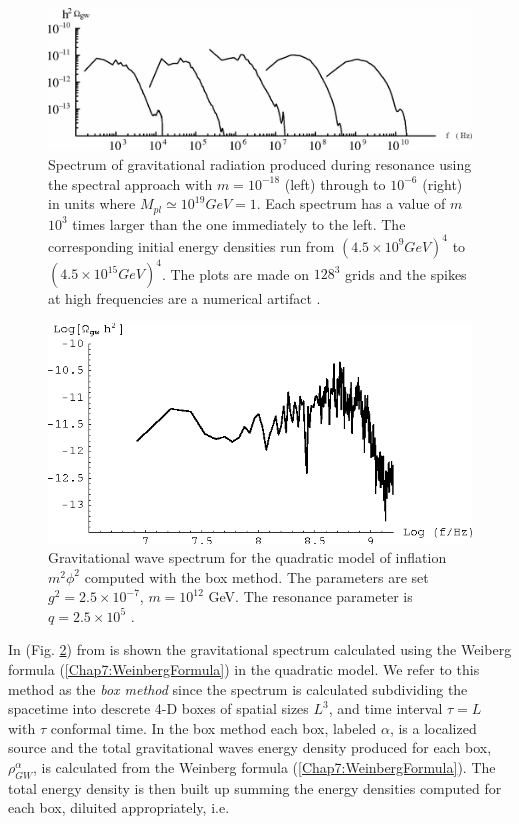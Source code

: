 \documentclass[11pt,a4paper,twoside]{book}
\begin{document}
\begin{figure}
	\centering
	\includegraphics[width=0.8\linewidth, height=0.3\textheight]{Images/Chap7/SpectralMethod_Fig1}
	\caption{Spectrum of gravitational radiation produced during resonance using the spectral approach with $m=10^{-18}$ (left) through to $ 10^{-6} $ (right) in units where $ M_{pl}\simeq 10^{19} GeV = 1 $. Each spectrum  has a value of $m$ $ 10^{3} $ times larger than the one immediately to the left. The corresponding initial energy densities run from $ (4.5 \times 10^{9} GeV)^{4} $ to $ (4.5 \times 10^{15} GeV)^{4} $. The plots are made on $ 128^{3} $ grids and the spikes at high frequencies are a numerical artifact \cite{Chap7:SpectralMethod}.}
	\label{fig:spectralmethodfig1}
\end{figure}
\begin{figure}
	\centering
	\includegraphics[width=0.6\linewidth, height=0.3\textheight]{Images/Chap7/BoxMethod_Fig4}
	\caption{Gravitational wave spectrum for the quadratic model of inflation $ m^{2}\phi^{2} $ computed with the box method. The parameters are set $ g^{2}=2.5\times 10^{-7} $, $ m=10^{12} $ GeV. The resonance parameter is $ q=2.5 \times 10^{5} $ \cite{Chap7:BoxMethod}.}
	\label{fig:boxmethodfig4}
\end{figure}
  In (Fig. \ref{fig:boxmethodfig4}) from \cite{Chap7:BoxMethod} is shown the gravitational spectrum calculated using the Weiberg formula (\ref{Chap7:WeinbergFormula}) in the quadratic model. We refer to this  method as the \textit{box method} since the spectrum is calculated subdividing the spacetime into descrete 4-D boxes of spatial sizes $ L^{3} $, and time interval $ \tau=L $ with $\tau$ conformal time. In the box method each box, labeled $\alpha$, is a localized source and the total gravitational waves energy density produced for each box, $\rho_{GW}^{\alpha}$, is calculated from the Weinberg formula (\ref{Chap7:WeinbergFormula}). The total energy density is then built up summing the energy densities computed for each box, diluited  appropriately, i.e.
\end{document}
